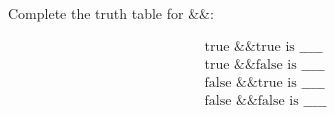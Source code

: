 Complete the truth table for \&\&:



\begin{align*}

& \text{true \&\& true is \_\_\_\_\_}\\

& \text{true \&\& false is \_\_\_\_\_}\\

& \text{false \&\& true is \_\_\_\_\_}\\

& \text{false \&\& false is \_\_\_\_\_}\\

\end{align*}

